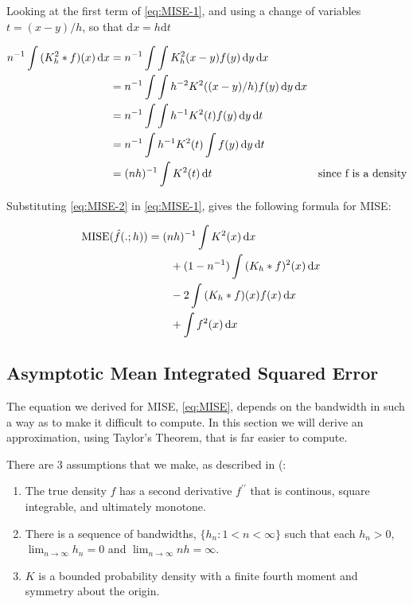 Looking at the first term of \autoref{eq:MISE-1}, and using a change of variables $t = (x - y) / h$, so that $\mathrm{d}x = h \mathrm{d}t$

\begin{align}
n^{-1} \int{ (\ensuremath{K_h^2 \ast f})(x)\,\mathrm{d}x } & = n^{-1} \int{ \int {K_h^2(x-y)f(y)\,\mathrm{d}y} \,\mathrm{d}x } && \nonumber \\
    & = n^{-1} \int{ \int {h^{-2} K^2( (x-y)/h )f(y)\,\mathrm{d}y} \,\mathrm{d}x } && \nonumber \\
    & = n^{-1} \int{ \int {h^{-1} K^2(t)f(y)\,\mathrm{d}y} \,\mathrm{d}t } && \nonumber \\
    & = n^{-1} \int{ h^{-1} K^2(t) \int {f(y)\,\mathrm{d}y} \,\mathrm{d}t } && \nonumber \\
    & = (nh)^{-1} \int{ K^2(t) \,\mathrm{d}t } \label{eq:MISE-2} && \text{since f is a density}
\end{align}

Substituting \autoref{eq:MISE-2} in \autoref{eq:MISE-1}, gives the following formula for MISE:

\begin{align}
\mbox{MISE}(\hat{f}(.;h)) & = (nh)^{-1} \int{ K^2(x) \,\mathrm{d}x } && \nonumber \\
    & \qquad + (1 - n^{-1}) \int{(\ensuremath{K_h \ast f})^2(x)\,\mathrm{d}x } && \nonumber \\
    & \qquad - 2\int{(\ensuremath{K_h \ast f})(x) f(x)\,\mathrm{d}x } && \nonumber \\
    & \qquad + \int{ f^2(x)\,\mathrm{d}x} \label{eq:MISE} &&
\end{align}

\subsection{Asymptotic Mean Integrated Squared Error}

The equation we derived for MISE, \autoref{eq:MISE}, depends on the bandwidth in such a way as to make it difficult to compute.
In this section we will derive an approximation, using Taylor's Theorem, that is far easier to compute.

There are 3 assumptions that we make, as described in (\citep[pp. 19-20]{wand1994kernel}:

\begin{enumerate}
    \item \label{asm:second_deriv} The true density $f$ has a second derivative $f^{\prime\prime}$ that is continous, square integrable, and ultimately monotone.
    \item \label{asm:h_to_zero} There is a sequence of bandwidths, \mbox{$\{h_n : 1 < n < \infty\}$} such that each \mbox{$h_n > 0$, $\lim_{n \to \infty} h_n = 0$} and \mbox{$\lim_{n \to \infty} nh = \infty$}.
    \item \label{asm:K_pdf} $K$ is a bounded probability density with a finite fourth moment and symmetry about the origin.
\end{enumerate}

